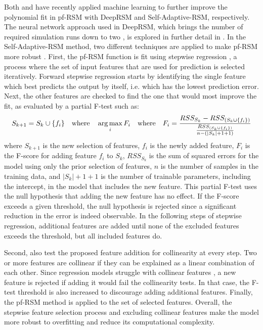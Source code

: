 \newpar Both \textcite{deep-rsm-2020} and \textcite{self-adaptive-rsm-2022} have recently applied machine learning to further improve the polynomial fit in pf-RSM with DeepRSM and Self-Adaptive-RSM, respectively. The neural network approach used in DeepRSM, which brings the number of required simulation runs down to two \cite{deep-rsm-2020}, is explored in further detail in . In the Self-Adaptive-RSM method, two different techniques are applied to make pf-RSM more robust \cite{self-adaptive-rsm-2022}. First, the pf-RSM function is fit using stepwise regression \cite{stepwise-regression-2010}, a process where the set of input features that are used for prediction is selected iteratively. Forward stepwise regression starts by identifying the single feature which best predicts the output by itself, i.e. which has the lowest prediction error. Next, the other features are checked to find the one that would most improve the fit, as evaluated by a partial F-test \cite{self-adaptive-rsm-2022} such as:
\begin{equation*}
    S_{k+1} = S_k \cup \{ f_i \} \quad \text{where} \quad \operatorname*{arg\,max}_{i} F_i \quad \text{where} \quad F_i = \frac{RSS_{S_k} - RSS_{(S_k \cup \{f_i\})}}{\frac{RSS_{(S_k \cup \{f_i\})}}{n - (|S_k| + 1 + 1)}}
\end{equation*}
where $S_{k+1}$ is the new selection of features, $f_i$ is the newly added feature, $F_i$ is the F-score for adding feature $f_i$ to $S_k$, $RSS_{S_k}$ is the sum of squared errors for the model using only the prior selection of features, $n$ is the number of samples in the training data, and $|S_k| + 1 + 1$ is the number of trainable parameters, including the intercept, in the model that includes the new feature. This partial F-test uses the null hypothesis that adding the new feature has no effect. If the F-score exceeds a given threshold, the null hypothesis is rejected since a significant reduction in the error is indeed observable. In the following steps of stepwise regression, additional features are added until none of the excluded features exceeds the threshold, but all included features do.

Second, \citeauthor{self-adaptive-rsm-2022} also test the proposed feature addition for collinearity at every step. Two or more features are collinear if they can be explained as a linear combination of each other. Since regression models struggle with collinear features \cite{regression-collinearity-1984}, a new feature is rejected if adding it would fail the collinearity tests. In that case, the F-test threshold is also increased to discourage adding additional features. Finally, the pf-RSM method is applied to the set of selected features. Overall, the stepwise feature selection process and excluding collinear features make the model more robust to overfitting and reduce its computational complexity.

